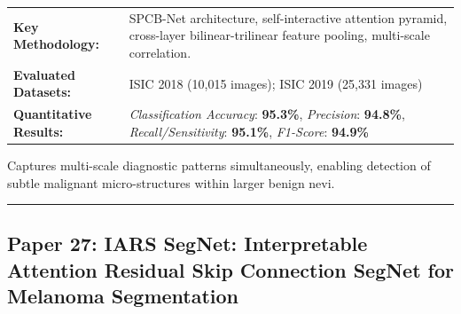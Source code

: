 \documentclass[10pt,a4paper]{article}
\begin{document}
\vspace{4pt}
\begin{tabularx}{\linewidth}{p{3.2cm}X}
\toprule
\textbf{Key Methodology:} & SPCB-Net architecture, self-interactive attention pyramid, cross-layer bilinear-trilinear feature pooling, multi-scale correlation. \\
\textbf{Evaluated Datasets:} & ISIC 2018 (10,015 images); ISIC 2019 (25,331 images) \\
\textbf{Quantitative Results:} & \textit{Classification Accuracy}: \textbf{95.3\%}, \textit{Precision}: \textbf{94.8\%}, \textit{Recall/Sensitivity}: \textbf{95.1\%}, \textit{F1-Score}: \textbf{94.9\%} \\
\bottomrule
\end{tabularx}
\vspace{4pt}
\begin{tcolorbox}[utilitybox,title=Clinical Utility and Real-World Impact]
Captures multi-scale diagnostic patterns simultaneously, enabling detection of subtle malignant micro-structures within larger benign nevi.
\end{tcolorbox}
\vspace{12pt}
\hrule
\vspace{12pt}
\subsection*{Paper 27: IARS SegNet: Interpretable Attention Residual Skip Connection SegNet for Melanoma Segmentation}
\end{document}
